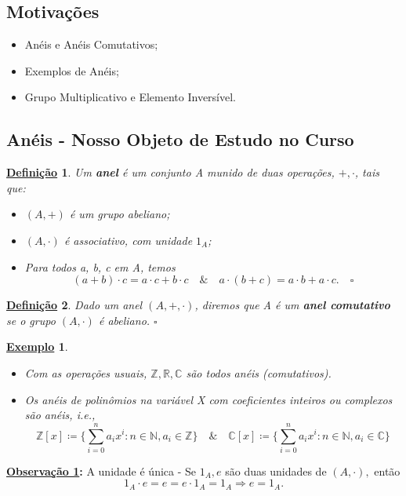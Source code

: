 \documentclass{article}
\newtheorem*{def*}{\underline{Defini\c c\~ao}}
\newtheorem{example}{\underline{Exemplo}}
\begin{document}
\subsection{Motivações}
\begin{itemize}
  \item Anéis e Anéis Comutativos;
  \item Exemplos de Anéis;
  \item Grupo Multiplicativo e Elemento Inversível.
\end{itemize}
\subsection{Anéis - Nosso Objeto de Estudo no Curso}
 \begin{def*}
  Um \textbf{anel} é um conjunto A munido de duas operações, \(+, \cdot \), tais que:
 \begin{itemize}
  \item[1)] \((A, +)\) é um grupo abeliano;
  \item[2)] \((A, \cdot )\) é associativo, com unidade \(1_{A}\);
  \item[3)] Para todos a, b, c em A, temos 
    \[
      (a+b)\cdot c = a \cdot c + b \cdot c \quad\&\quad a \cdot (b+c) = a \cdot b + a \cdot c.\quad\square
    \]
 \end{itemize}
 \end{def*}
\begin{def*}
   Dado um anel \((A, +, \cdot )\), diremos que A é um \textbf{anel comutativo} se o grupo \((A, \cdot )\) é abeliano. \(\square\)
\end{def*}
\begin{example}
 \begin{itemize}
  \item[1)] Com as operações usuais, \(\mathbb{Z}, \mathbb{R}, \mathbb{C}\) são todos anéis (comutativos).
  \item[2)] Os anéis de polinômios na variável X com coeficientes inteiros ou complexos são anéis, i.e., 
    \[
      \mathbb{Z}[x]\coloneqq \biggl\{\sum\limits_{i=0}^{n}a_{i}x^{i}: n\in \mathbb{N}, a_{i}\in \mathbb{Z}\biggr\}\quad\&\quad \mathbb{C}[x]\coloneqq \biggl\{\sum\limits_{i=0}^{n}a_{i}x^{i}:n\in \mathbb{N}, a_{i}\in \mathbb{C}\biggr\}
    \]
 \end{itemize}
\end{example}
\textbf{\underline{Observação 1}:} A unidade é única - Se \(1_{A}, e\) são duas unidades de \((A, \cdot ),\) então 
  \[
    1_{A}\cdot e = e = e \cdot 1_{A} = 1_{A} \Rightarrow e = 1_{A}.
  \]
\end{document}
